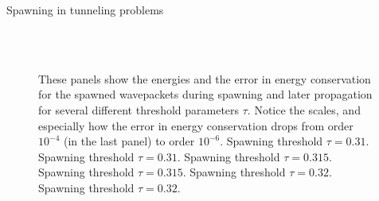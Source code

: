 \begin{chapter}{Spawning in tunneling problems}
\begin{figure}[h!]
{  } \\
   \\
  \caption[Energies and energy drift of the spawned wavepackets during spawning and later propagation]{
  These panels show the energies and the error in energy conservation for the spawned wavepackets
  during spawning and later propagation for several different threshold parameters $\tau$.
  Notice the scales, and especially how the error in energy conservation drops from order $10^{-4}$
  (in the last panel) to order $10^{-6}$.
   Spawning threshold $\tau = 0.31$.
   Spawning threshold $\tau = 0.31$.
   Spawning threshold $\tau = 0.315$.
   Spawning threshold $\tau = 0.315$.
   Spawning threshold $\tau = 0.32$.
   Spawning threshold $\tau = 0.32$.
  \label{fig:spawn_propag_K100_spawn_threshold_energies_spawn2}
  }
\end{figure}



\end{chapter}
